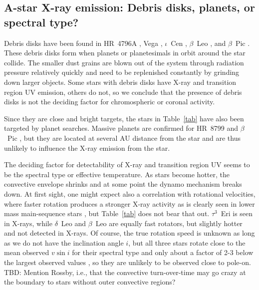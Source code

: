 \documentclass[preprint2]{aastex631}
\begin{document}
\subsection{A-star  X-ray emission: Debris disks, planets, or spectral type?}
Debris disks have been found in 
HR~4796A \citep[e.g.][]{1991ApJ...383L..79J}, Vega
\citep[e.g.][]{2005ApJ...628..487S}, $\iota$~Cen
\citep[e.g.][]{2011ApJ...736L..32Q}, $\beta$~Leo  \citep[e.g.][]{2021AJ....161..186D}, and
$\beta$~Pic \citep[e.g.][]{2001MNRAS.323..402L}.  These debris disks
form when planets or planetesimals in orbit around the star
collide. The smaller dust grains are blown out of the system through
radiation pressure relatively quickly and need to be replenished
constantly by grinding down larger objects. 
Some stars with debris disks have X-ray and transition region UV emission, others do not, so we conclude that the presence of debris disks is not the deciding factor for chromospheric or coronal activity.

Since they are close and bright targets, the stars in Table~\ref{tab}
have also been targeted by planet searches. Massive planets are
confirmed for HR~8799 \citep{2008Sci...322.1348M} and $\beta$~Pic
\citep[e.g.][]{2021AJ....161..179B}, but they are located at several
AU distance from the star and are thus unlikely to influence the
X-ray emission from the star.

The deciding factor for detectability of X-ray and transition region UV seems to be the spectral type or effective temperature. As stars become hotter, the convective envelope shrinks and at some point the dynamo mechanism breaks down. At first sight, one might expect also a correlation with rotational velocities, where faster rotation produces a stronger X-ray activity as is clearly seen in lower mass main-sequence stars \citep{2011ApJ...743...48W}, but Table~\ref{tab} does not bear that out. $\tau^3$~Eri is seen in X-rays, while $\delta$~Leo and $\beta$~Leo are equally fast rotators, but slightly hotter and not detected in X-rays. Of course, the true rotation speed is unknown as long as we do not have the inclination angle $i$, but all three stars rotate close to the mean observed $v \sin i$ for their spectral type and only about a factor of 2-3 below the largest observed values \citep{1995ApJS...99..135A}, so they are unlikely to be observed close to pole-on.
{\color{red} TBD: Mention Rossby, i.e., that the convective turn-over-time may go crazy at the boundary to stars without outer convective regions?}
\end{document}
